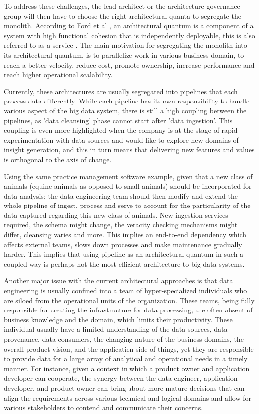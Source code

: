 \documentclass[review]{elsarticle}
\begin{document}
To address these challenges, the lead architect or the architecture governance group will then have to choose the right architectural quanta to segregate the monolith. According to Ford et al \cite{ford2017building}, an architectural quantum is a component of a system with high functional cohesion that is independently deployable, this is also referred to as a service \cite{newman2021building}. The main motivation for segregating the monolith into its architectural quantum, is to parallelize work in various business domain, to reach a better velocity, reduce cost, promote ownership, increase performance and reach higher operational scalability.

Currently, these architectures are usually segregated into pipelines that each process data differently. While each pipeline has its own responsibility to handle various aspect of the big data system, there is still a high coupling between the pipelines, as 'data cleansing' phase cannot start after 'data ingestion'. This coupling is even more highlighted when the company is at the stage of rapid experimentation with data sources and would like to explore new domains of insight generation, and this in turn means that delivering new features and values is orthogonal to the axis of change. 

Using the same practice management software example, given that a new class of animals (equine animals as opposed to small animals) should be incorporated for data analysis; the data engineering team should then modify and extend the whole pipeline of ingest, process and serve to account for the particularity of the data captured regarding this new class of animals. New ingestion services required, the schema might change, the veracity checking mechanisms might differ, cleansing varies and more. This implies an end-to-end dependency which affects external teams, slows down processes and make maintenance gradually harder. This implies that using pipeline as an architectural quantum in such a coupled way is perhaps not the most efficient architecture to big data systems. 

Another major issue with the current architectural approaches is that data engineering is usually confined into a team of hyper-specialized individuals who are siloed from the operational units of the organization. These teams, being fully responsible for creating the infrastructure for data processing, are often absent of business knowledge and the domain, which limits their productivity. These individual usually have a limited understanding of the data sources, data provenance, data consumers, the changing nature of the business domains, the overall product vision, and the application side of things, yet they are responsible to provide data for a large array of analytical and operational needs in a timely manner. For instance, given a context in which a product owner and application developer can cooperate, the synergy between the data engineer, application developer, and product owner can bring about more mature decisions that can align the requirements across various technical and logical domains and allow for various stakeholders to contend and communicate their concerns.
\end{document}
